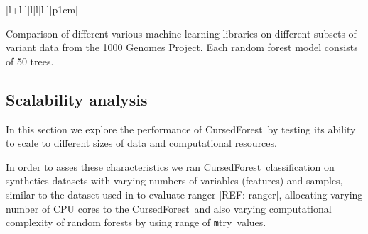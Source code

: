 \documentclass[10pt,letterpaper]{article}
\newcommand{\cursedforest}{{\sc CursedForest}}
\newcommand{\mtry}{{\texttt mtry}}
\begin{document}
\begin{table}[!ht]
\begin{minipage}{\textwidth}
\begin{adjustwidth}{-2.25in}{0in}
\begin{tabular}{|l+l|l|l|l|l|l|p{1cm}|}
\end{tabular}
\begin{flushleft} 
Comparison of different various machine learning libraries on different subsets of variant data 
from the 1000 Genomes Project.
Each random forest model consists of 50 trees.
\end{flushleft}
\label{table1}
\end{adjustwidth}
\end{minipage}
\end{table}


\subsection{Scalability analysis}

In this section we explore the performance of \cursedforest\ by testing its ability to scale to different sizes of data and computational resources.

In order to asses these characteristics we ran \cursedforest\ classification on synthetics datasets with varying numbers of variables (features) and samples, similar to the dataset used in to evaluate ranger [REF: ranger], allocating varying number of CPU cores to the \cursedforest\ and also varying computational complexity of random forests by using range of \mtry\ values.
\end{document}
